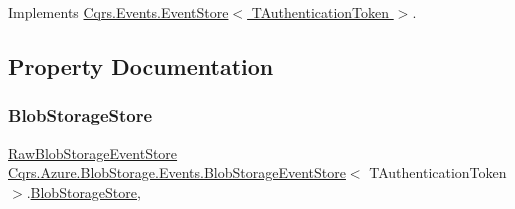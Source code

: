 Implements \hyperlink{classCqrs_1_1Events_1_1EventStore_aedb71ca0ddf21220e323bc60ad7508cd_aedb71ca0ddf21220e323bc60ad7508cd}{Cqrs.\+Events.\+Event\+Store$<$ T\+Authentication\+Token $>$}.



\subsection{Property Documentation}
\mbox{\label{classCqrs_1_1Azure_1_1BlobStorage_1_1Events_1_1BlobStorageEventStore_a85b9d71c130e5748886a61d80447116d_a85b9d71c130e5748886a61d80447116d}} 
\subsubsection{\texorpdfstring{Blob\+Storage\+Store}{BlobStorageStore}}
{\footnotesize\ttfamily \hyperlink{classCqrs_1_1Azure_1_1BlobStorage_1_1Events_1_1BlobStorageEventStore_1_1RawBlobStorageEventStore}{Raw\+Blob\+Storage\+Event\+Store} \hyperlink{classCqrs_1_1Azure_1_1BlobStorage_1_1Events_1_1BlobStorageEventStore}{Cqrs.\+Azure.\+Blob\+Storage.\+Events.\+Blob\+Storage\+Event\+Store}$<$ T\+Authentication\+Token $>$.\hyperlink{classCqrs_1_1Azure_1_1BlobStorage_1_1BlobStorageStore}{Blob\+Storage\+Store}\hspace{0.3cm}{\ttfamily [get]}, {\ttfamily [protected]}}


